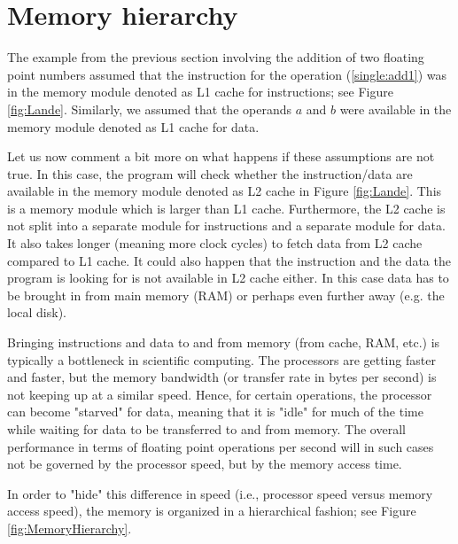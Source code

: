 \documentclass[11pt]{article}
\begin{document}
\section{Memory hierarchy}

The example from the previous section
involving the addition of two floating point numbers 
assumed that the instruction for the operation 
(\ref{single:add1}) was in the memory module denoted as L1 cache 
for instructions; see Figure \ref{fig:Lande}.  Similarly, we assumed 
that the operands $a$ and $b$ were available in the memory module 
denoted as L1 cache for data. 

Let us now comment a bit more on what happens if these assumptions are not true.  
In this case, the program will check whether the instruction/data are 
available in the memory module denoted as L2 cache in Figure \ref{fig:Lande}.
This is a memory module which is larger than L1 cache. 
Furthermore, the L2 cache is not split into a separate module for instructions 
and a separate module for data. It also takes longer (meaning more clock cycles) 
to fetch data from L2 cache compared to L1 cache. 
It could also happen that the instruction and the data the program is looking
for is not available in L2 cache either. In this case data has to be brought 
in from main memory (RAM) or perhaps even further away (e.g. the local disk). 

Bringing instructions and data to and from memory (from cache, RAM, etc.) 
is typically a bottleneck in scientific computing. The processors are getting 
faster and faster, but the memory bandwidth (or transfer rate in bytes per second)
is not keeping up at a similar speed. Hence, for certain operations, the processor 
can become "starved" for data, meaning that it is "idle" for much 
of the time while waiting for data to be transferred to and from memory. 
The overall performance in terms of floating point operations per second 
will in such cases not be governed by the processor speed, but by the 
memory access time. 

In order to "hide" this difference in speed (i.e., processor speed versus 
memory access speed), the memory is organized in a hierarchical fashion; 
see Figure \ref{fig:MemoryHierarchy}.
\vspace{.5cm}
\end{document}
